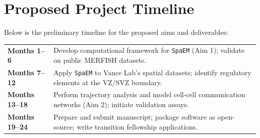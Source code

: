 \section{Proposed Project Timeline}
Below is the preliminary timeline for the proposed aims and deliverables:

\vspace{0.5em}
\noindent
\begin{tabularx}{\linewidth}{@{}>{\color{accent}\bfseries}l@{\hspace{6mm}}>{\raggedright\arraybackslash}X@{}}
  Months 1--6   & Develop computational framework for \texttt{SpaEM} (Aim 1); validate on public MERFISH datasets. \\
  Months 7--12  & Apply \texttt{SpaEM} to Vance Lab's spatial datasets; identify regulatory elements at the VZ/SVZ boundary. \\
  Months 13--18 & Perform trajectory analysis and model cell-cell communication networks (Aim 2); initiate validation assays. \\
  Months 19--24 & Prepare and submit manuscript; package software as open-source; write transition fellowship applications.
\end{tabularx}
